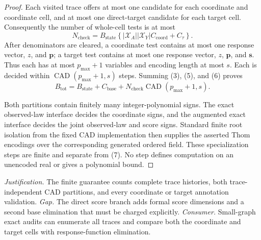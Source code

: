 \documentclass{article}
\begin{document}
\begin{proof}
Each visited trace offers at most one candidate for each coordinate and coordinate cell, and at most one direct-target candidate for each target cell. Consequently the number of whole-cell tests is at most
\[
N_{\mathrm{check}}
=B_{\mathrm{state}}
\left\{|\mathcal X_A||\mathcal X_Y|C_{\mathrm{coord}}+C_{\tau}\right\}.
\tag{6}
\]
After denominators are cleared, a coordinate test contains at most one response vector, \(z\), and \(\mathbf p\); a target test contains at most one response vector, \(z\), \(\mathbf p\), and \(\mathbf s\). Thus each has at most \(p_{\max}+1\) variables and encoding length at most \(s\). Each is decided within \(\operatorname{CAD}(p_{\max}+1,s)\) steps. Summing (3), (5), and (6) proves
\[
B_{\mathrm{tot}}
=B_{\mathrm{state}}+C_{\mathrm{base}}
+N_{\mathrm{check}}\operatorname{CAD}(p_{\max}+1,s).
\tag{7}
\]

Both partitions contain finitely many integer-polynomial signs. The exact observed-law interface decides the coordinate signs, and the augmented exact interface decides the joint observed-law and score signs. Standard finite root isolation from the fixed CAD implementation then supplies the asserted Thom encodings over the corresponding generated ordered field. These specialization steps are finite and separate from (7). No step defines computation on an unencoded real or gives a polynomial bound.
\end{proof}
\par\smallskip\noindent \textit{Justification.} The finite guarantee counts complete trace histories, both trace-independent CAD partitions, and every coordinate or target annotation validation. \textit{Gap.} The direct score branch adds formal score dimensions and a second base elimination that must be charged explicitly. \textit{Consumer.} Small-graph exact audits can enumerate all traces and compare both the coordinate and target cells with response-function elimination.
\end{document}

